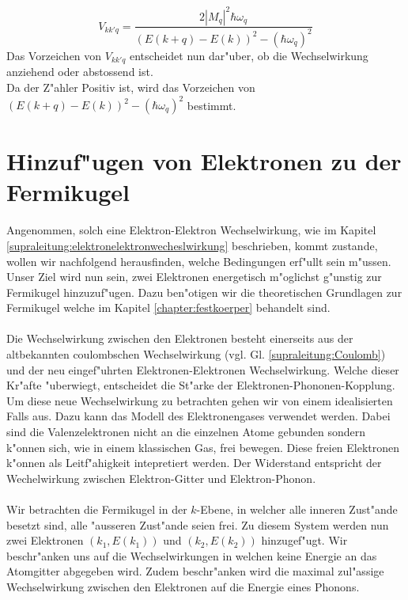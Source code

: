 \begin{refsection}
\begin{equation}
V_{kk'q} =
\frac
{2|M_q|^2\hbar\omega_q}
{(E(k+q)-E(k))^2-(\hbar\omega_q)^2}
\label{supraleitung:Wechelwirkung_Vkk'q_Kurz}
\end{equation}
Das Vorzeichen von $V_{kk'q}$ entscheidet nun dar"uber, ob die Wechselwirkung anziehend oder abstossend ist.\\
Da der Z"ahler Positiv ist, wird das Vorzeichen von $(E(k+q)-E(k))^2-(\hbar\omega_q)^2$ bestimmt.


\section{Hinzuf"ugen von Elektronen zu der Fermikugel}
Angenommen, solch eine Elektron-Elektron Wechselwirkung, wie im Kapitel \ref{supraleitung:elektronelektronwecheslwirkung} beschrieben, kommt zustande, wollen wir nachfolgend herausfinden, welche Bedingungen erf"ullt sein m"ussen.
\\
Unser Ziel wird nun sein, zwei Elektronen energetisch m"oglichst g"unstig zur Fermikugel hinzuzuf"ugen. Dazu ben"otigen wir die theoretischen Grundlagen zur Fermikugel welche im Kapitel \ref{chapter:festkoerper} behandelt sind.
\\
\\
Die Wechselwirkung zwischen den Elektronen besteht einerseits aus der altbekannten coulombschen Wechselwirkung (vgl. Gl. \ref{supraleitung:Coulomb}) und der neu eingef"uhrten Elektronen-Elektronen Wechselwirkung. Welche dieser Kr"afte "uberwiegt, entscheidet die St"arke der Elektronen-Phononen-Kopplung.
\\
Um diese neue Wechselwirkung zu betrachten gehen wir von einem idealisierten Falls aus. Dazu kann das Modell des Elektronengases verwendet werden. Dabei sind die Valenzelektronen nicht an die einzelnen Atome gebunden sondern k"onnen sich, wie in einem klassischen Gas, frei bewegen. Diese freien Elektronen k"onnen als Leitf"ahigkeit intepretiert werden. Der Widerstand entspricht der Wechelwirkung zwischen Elektron-Gitter und Elektron-Phonon.
\\
\\
Wir betrachten die Fermikugel in der $k$-Ebene, in welcher alle inneren Zust"ande besetzt sind, alle "ausseren Zust"ande seien frei. Zu diesem System werden nun zwei Elektronen $(k_1,E(k_1))$ und $(k_2,E(k_2))$ hinzugef"ugt. Wir beschr"anken uns auf die Wechselwirkungen in welchen keine Energie an das Atomgitter abgegeben wird. Zudem beschr"anken wird die maximal zul"assige Wechselwirkung zwischen den Elektronen auf die Energie eines Phonons.


\end{refsection}
